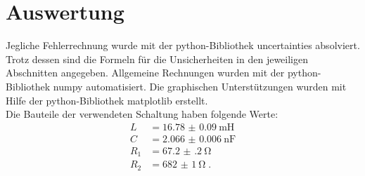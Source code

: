 \section{Auswertung}
\label{sec:Auswertung}
Jegliche Fehlerrechnung wurde mit der python-Bibliothek uncertainties \cite{uncertainties} absolviert.
Trotz dessen sind die Formeln für die Unsicherheiten in den jeweiligen Abschnitten angegeben.
Allgemeine Rechnungen wurden mit der python-Bibliothek numpy \cite{numpy} automatisiert. 
Die graphischen Unterstützungen wurden mit Hilfe der python-Bibliothek matplotlib \cite{matplotlib} erstellt.\\
Die Bauteile der verwendeten Schaltung haben folgende Werte:
\begin{align*}
    L   & = \SI{16.78(9)} {\milli\henry}\\
    C   & = \SI{2.066(6)} {\nano\farad} \\
    R_1 & = \SI{67.2(2)}  {\ohm}        \\
    R_2 & = \SI{682(1)}   {\ohm} \; \text{.}
\end{align*}
